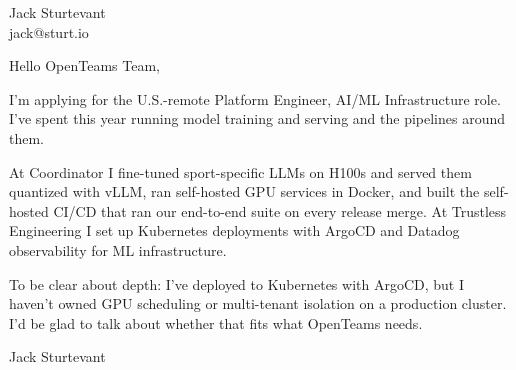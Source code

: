 \documentclass[11pt]{article}
\begin{document}
\raggedright

{\namefont\fontsize{20pt}{24pt}\selectfont Jack Sturtevant}\\[-0.3em]
jack@sturt.io

\vspace{1.2em}

Hello OpenTeams Team,

I'm applying for the U.S.-remote Platform Engineer, AI/ML Infrastructure role. I've spent this year running model training and serving and the pipelines around them.

At Coordinator I fine-tuned sport-specific LLMs on H100s and served them quantized with vLLM, ran self-hosted GPU services in Docker, and built the self-hosted CI/CD that ran our end-to-end suite on every release merge. At Trustless Engineering I set up Kubernetes deployments with ArgoCD and Datadog observability for ML infrastructure.

To be clear about depth: I've deployed to Kubernetes with ArgoCD, but I haven't owned GPU scheduling or multi-tenant isolation on a production cluster. I'd be glad to talk about whether that fits what OpenTeams needs.

\vspace{0.6em}
Jack Sturtevant
\end{document}
